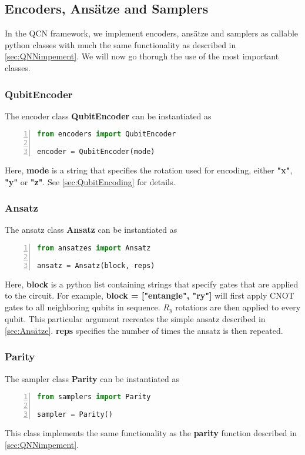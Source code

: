 \subsection{Encoders, Ansätze and Samplers}\label{sec:EAaS}
In the QCN framework, we implement encoders, ansätze and samplers as callable python classes with much the same functionality as described in \autoref{sec:QNNimpement}. We will now go thorugh the use of the most important classes.

\subsubsection*{QubitEncoder}
The encoder class \textbf{QubitEncoder} can be instantiated as 

\begin{lstlisting}[language=python, numbers=left]
from encoders import QubitEncoder

encoder = QubitEncoder(mode)
\end{lstlisting}

Here, \textbf{mode} is a string that specifies the rotation used for encoding, either \textbf{"x"}, \textbf{"y"} or \textbf{"z"}. See \autoref{sec:QubitEncoding} for details.

\subsubsection*{Ansatz}
The ansatz class \textbf{Ansatz} can be instantiated as
\begin{lstlisting}[language=python, numbers=left]
from ansatzes import Ansatz

ansatz = Ansatz(block, reps)
\end{lstlisting}
Here, \textbf{block} is a python list containing strings that specify gates that are applied to the circuit. For example, 
\textbf{block = ["entangle", "ry"]} will first apply CNOT gates to all neighboring qubits in sequence. $R_y$ rotations are then applied to every qubit. This particular argument recreates the simple ansatz described in \autoref{sec:Ansätze}. \textbf{reps} specifies the number of times the ansatz is then repeated.

\subsubsection*{Parity}
The sampler class \textbf{Parity} can be instantiated as
\begin{lstlisting}[language=python, numbers=left]
from samplers import Parity

sampler = Parity()
\end{lstlisting}
This class implements the same functionality as the \textbf{parity} function described in \autoref{sec:QNNimpement}.


